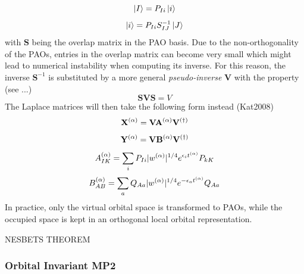 \begin{equation}
\ket{I} = P_{Ii} \ket{i}
\end{equation} 
\begin{equation}
\ket{i} = P_{Ii} S_{IJ}^{-1} \ket{J} 
\end{equation}
\noindent with $\mathbf{S}$ being the overlap matrix in the PAO basis. Due to the non-orthogonality of the PAOs, entries in the overlap matrix can become very small which might lead to numerical instability when computing its inverse. For this reason, the inverse $\mathbf{S}^{-1}$ is substituted by a more general \emph{pseudo-inverse} $\mathbf{V}$ with the property (see ...)
\begin{equation}
\mathbf{SVS} = V
\end{equation}
\noindent The Laplace matrices will then take the following form instead (Kat2008)
\begin{equation}
\mathbf{X}^{(\alpha)} = \mathbf{V} \mathbf{A}^{(\alpha)} \mathbf{V} ^{(\dagger)} 
\end{equation}
\begin{equation}
\mathbf{Y}^{(\alpha)} = \mathbf{V} \mathbf{B}^{(\alpha)} \mathbf{V} ^{(\dagger)} 
\end{equation}
\begin{equation}
A_{IK}^{(\alpha)} = \sum_i P_{Ii} |w^{(\alpha)}|^{1/4} e^{\epsilon_i t^{(\alpha)}} P_{kK}
\end{equation}
\begin{equation}
B_{AB}^{(\alpha)} = \sum_a Q_{Aa} |w^{(\alpha)}|^{1/4} e^{-\epsilon_a t^{(\alpha)}} Q_{Aa}
\end{equation}
\noindent In practice, only the virtual orbital space is transformed to PAOs, while the occupied space is kept in an orthogonal local orbital representation.



NESBETS THEOREM

\subsubsection{Orbital Invariant MP2}

